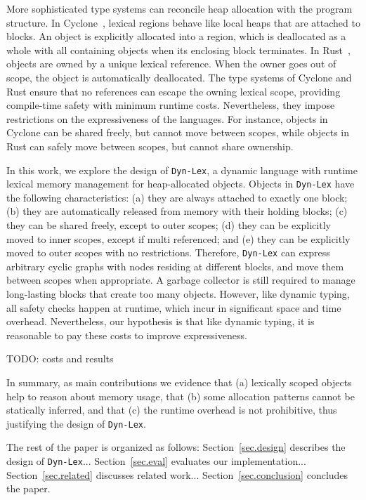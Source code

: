\documentclass[12pt]{article}
\newcommand{\lex} {\texttt{Dyn-Lex}\xspace}
\begin{document}
More sophisticated type systems can reconcile heap allocation with the program
structure.
%
In Cyclone~\cite{cyclone.regions}, lexical regions behave like local heaps that
are attached to blocks.
An object is explicitly allocated into a region, which is deallocated as a
whole with all containing objects when its enclosing block terminates.
%
In Rust~\cite{rust.book}, objects are owned by a unique lexical reference.
When the owner goes out of scope, the object is automatically deallocated.
%
The type systems of Cyclone and Rust ensure that no references can escape the
owning lexical scope, providing compile-time safety with minimum runtime
costs.
%
Nevertheless, they impose restrictions on the expressiveness of the languages.
For instance, objects in Cyclone can be shared freely, but cannot move between
scopes, while objects in Rust can safely move between scopes, but cannot share
ownership.

In this work, we explore the design of \lex, a dynamic language with runtime
lexical memory management for heap-allocated objects.
%
Objects in \lex have the following characteristics:
    (a) they are always attached to exactly one block;
    (b) they are automatically released from memory with their holding blocks;
    (c) they can be shared freely, except to outer scopes;
    (d) they can be explicitly moved to inner scopes, except if multi
        referenced; and
    (e) they can be explicitly moved to outer scopes with no restrictions.
%
Therefore, \lex can express arbitrary cyclic graphs with nodes residing at
different blocks, and move them between scopes when appropriate.
A garbage collector is still required to manage long-lasting blocks that create
too many objects.
%
However, like dynamic typing, all safety checks happen at runtime, which incur
in significant space and time overhead.
Nevertheless, our hypothesis is that like dynamic typing, it is reasonable to
pay these costs to improve expressiveness.

TODO: costs and results

In summary, as main contributions we evidence that
(a) lexically scoped objects help to reason about memory usage, that
(b) some allocation patterns cannot be statically inferred, and that
(c) the runtime overhead is not prohibitive, thus justifying the design of
    \lex.

The rest of the paper is organized as follows:
Section~\ref{sec.design} describes the design of \lex...
Section~\ref{sec.eval} evaluates our implementation...
Section~\ref{sec.related} discusses related work...
Section~\ref{sec.conclusion} concludes the paper.
\end{document}
